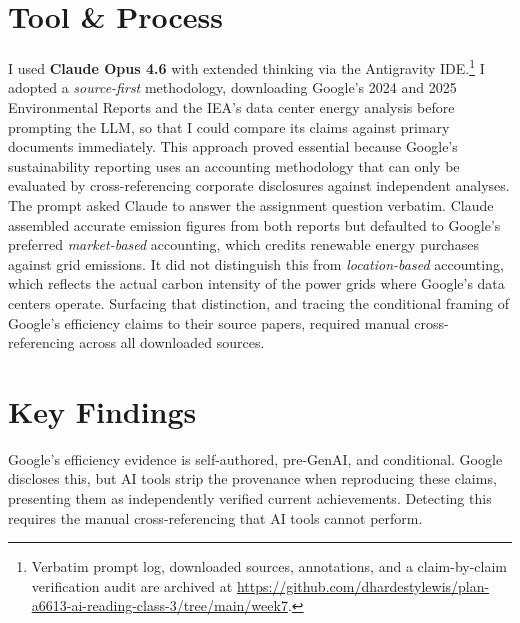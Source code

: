 \documentclass[11pt, twocolumn]{article}
\begin{document}

\section*{Tool \& Process}
I used \textbf{Claude Opus 4.6} with extended thinking via the Antigravity IDE.\footnote{Verbatim prompt log, downloaded sources, annotations, and a claim-by-claim verification audit are archived at \url{https://github.com/dhardestylewis/plan-a6613-ai-reading-class-3/tree/main/week7}.} I adopted a \textit{source-first} methodology, downloading Google's 2024 and 2025 Environmental Reports and the IEA's data center energy analysis before prompting the LLM, so that I could compare its claims against primary documents immediately. This approach proved essential because Google's sustainability reporting uses an accounting methodology that can only be evaluated by cross-referencing corporate disclosures against independent analyses. The prompt asked Claude to answer the assignment question verbatim. Claude assembled accurate emission figures from both reports but defaulted to Google's preferred \textit{market-based} accounting, which credits renewable energy purchases against grid emissions. It did not distinguish this from \textit{location-based} accounting, which reflects the actual carbon intensity of the power grids where Google's data centers operate. Surfacing that distinction, and tracing the conditional framing of Google's efficiency claims to their source papers, required manual cross-referencing across all downloaded sources.

\section*{Key Findings}
\noindent Google's efficiency evidence is self-authored, pre-GenAI, and conditional. Google discloses this, but AI tools strip the provenance when reproducing these claims, presenting them as independently verified current achievements. Detecting this requires the manual cross-referencing that AI tools cannot perform.
\end{document}
